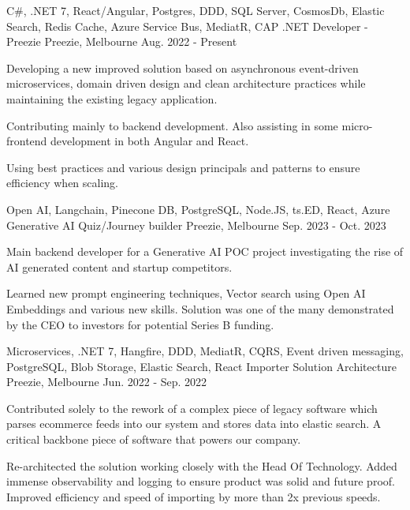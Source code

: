 

\vspace{-0.5\baselineskip}
\begin{cventries}
  \cventry
    {C\#, .NET 7, React/Angular, Postgres, DDD, SQL Server, CosmosDb, Elastic Search, Redis Cache, Azure Service Bus, MediatR, CAP}
    {.NET Developer - Preezie}
    {Preezie, Melbourne}
    {Aug. 2022 - Present}
    {
      \begin{cvitems}
        \item {Developing a new improved solution based on asynchronous event-driven microservices, domain driven design and clean architecture practices while maintaining the existing legacy application.}
        \item {Contributing mainly to backend development. Also assisting in some micro-frontend development in both Angular and React.}
        \item {Using best practices and various design principals and patterns to ensure efficiency when scaling.}
	  \end{cvitems}
    }
  \cventry
    {Open AI, Langchain, Pinecone DB, PostgreSQL, Node.JS, ts.ED, React, Azure}
    {Generative AI Quiz/Journey builder}
    {Preezie, Melbourne}
    {Sep. 2023 - Oct. 2023}
    {
      \begin{cvitems}
        \item {Main backend developer for a Generative AI POC project investigating the rise of AI generated content and startup competitors.}
        \item {Learned new prompt engineering techniques, Vector search using Open AI Embeddings and various new skills. Solution was one of the many demonstrated by the CEO to investors for potential Series B funding.}
      \end{cvitems}
    }
  \cventry
    {Microservices, .NET 7, Hangfire, DDD, MediatR, CQRS, Event driven messaging, PostgreSQL, Blob Storage, Elastic Search, React}
    {Importer Solution Architecture}
    {Preezie, Melbourne}
    {Jun. 2022 - Sep. 2022}
    {
      \begin{cvitems}
        \item {Contributed solely to the rework of a complex piece of legacy software which parses ecommerce feeds into our system and stores data into elastic search. A critical backbone piece of software that powers our company.}
        \item {Re-architected the solution working closely with the Head Of Technology. Added immense observability and logging to ensure product was solid and future proof. Improved efficiency and speed of importing by more than 2x previous speeds.}

\end{cvitems}}
\end{cventries}
